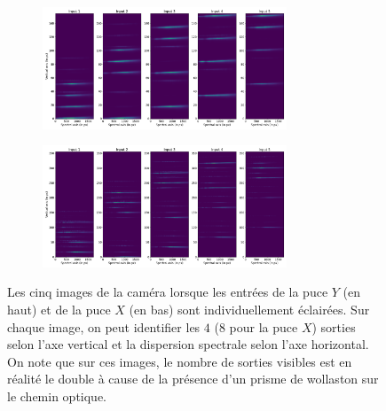\begin{figure}[ht!]
    \begin{subfigure}{\textwidth}
        \centering
        \includegraphics[width=0.8\textwidth]{Figure_Chap3/20221010_Flats.png}
    \end{subfigure}
    \begin{subfigure}{\textwidth}
        \centering
        \includegraphics[width=0.8\textwidth]{Figure_Chap3/20220811_Flats.png}
    \end{subfigure}
    \caption[Les flats mesurés sur les deux puces, sur FIRSTv2.]{Les cinq images de la caméra lorsque les entrées de la puce $Y$ (en haut) et de la puce $X$ (en bas) sont individuellement éclairées. Sur chaque image, on peut identifier les $4$ ($8$ pour la puce $X$) sorties selon l'axe vertical et la dispersion spectrale selon l'axe horizontal. On note que sur ces images, le nombre de sorties visibles est en réalité le double à cause de la présence d'un prisme de wollaston sur le chemin optique.}
    \label{fig:flats}
\end{figure}

